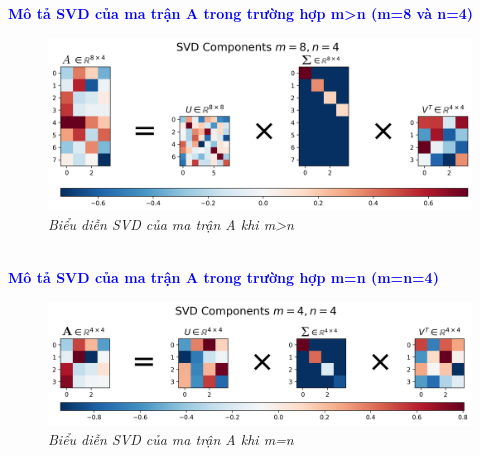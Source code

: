 \textbf{\textcolor{blue}{Mô tả SVD của ma trận A trong trường hợp m>n (m=8 và n=4)}} \\
\begin{figure}[!ht]
	\centering
	\includegraphics[scale=0.3]{svdm_lon_n}
	\caption{\textit{Biểu diễn SVD của ma trận A khi m>n}}\label{fig:Picture}
\end{figure}
\\
\textbf{\textcolor{blue}{Mô tả SVD của ma trận A trong trường hợp m=n (m=n=4)}} \\
\begin{figure}[!ht]
	\centering
	\includegraphics[scale=0.3]{svdm_bang_n}
	\caption{\textit{Biểu diễn SVD của ma trận A khi m=n}}\label{fig:Picture}
\end{figure}\\
